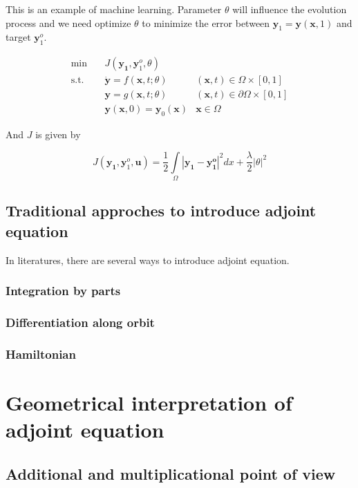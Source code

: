 \documentclass{article}
\begin{document}
This is an example of machine learning. Parameter $\theta$ will influence the evolution process and we need optimize $\theta$ to minimize the error between $ \mathbf{y}_1 = \mathbf{y}(\mathbf{x}, 1)$ and target $ \mathbf{y}_1^o $.

$$
\begin{array}{rcll}
\min &~& J(\mathbf{y_1}, \mathbf{y}_1^o, \theta) & \\
\mathrm{s.t.} &~& \dot{\mathbf{y}} = f(\mathbf{x}, t; \theta) & (\mathbf{x}, t) \in \Omega \times [0, 1] \\
&~& \mathbf{y} = g(\mathbf{x}, t; \theta) & (\mathbf{x}, t) \in \partial \Omega \times [0, 1] \\
&~& \mathbf{y}(\mathbf{x}, 0) = \mathbf{y}_0(\mathbf{x}) & \mathbf{x} \in \Omega
\end{array}
$$

And $ J $ is given by

$$
J(\mathbf{y_1}, \mathbf{y}_1^o, \mathbf{u}) = \frac{1}{2} \int\limits_{\Omega}|\mathbf{y_1} - \mathbf{y_1^o}|^2dx + \frac{\lambda}{2} |\theta|^2
$$

\subsection{Traditional approches to introduce adjoint equation}

In literatures, there are several ways to introduce adjoint equation.

\subsubsection{Integration by parts}

\subsubsection{Differentiation along orbit}

\subsubsection{Hamiltonian}

\section{Geometrical interpretation of adjoint equation}

\subsection{Additional and multiplicational point of view}
\end{document}
